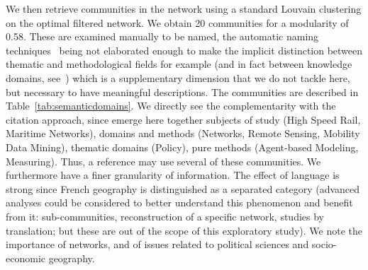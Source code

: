 \documentclass[10pt]{article}
\begin{document}
We then retrieve communities in the network using a standard Louvain clustering on the optimal filtered network. We obtain 20 communities for a modularity of 0.58. These are examined manually to be named, the automatic naming techniques~\cite{yang2000improving} being not elaborated enough to make the implicit distinction between thematic and methodological fields for example (and in fact between knowledge domains, see~\cite{raimbault2017applied}) which is a supplementary dimension that we do not tackle here, but necessary to have meaningful descriptions. The communities are described in Table~\ref{tab:semanticdomains}. We directly see the complementarity with the citation approach, since emerge here together subjects of study (High Speed Rail, Maritime Networks), domains and methods (Networks, Remote Sensing, Mobility Data Mining), thematic domains (Policy), pure methods (Agent-based Modeling, Measuring). Thus, a reference may use several of these communities. We furthermore have a finer granularity of information. The effect of language is strong since French geography is distinguished as a separated category (advanced analyses could be considered to better understand this phenomenon and benefit from it: sub-communities, reconstruction of a specific network, studies by translation; but these are out of the scope of this exploratory study). We note the importance of networks, and of issues related to political sciences and socio-economic geography.
\end{document}
